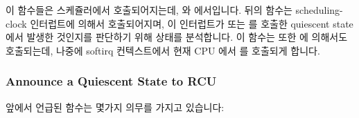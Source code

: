 이 함수들은 스케쥴러에서 호출되어지는데,  와
 에서입니다.
뒤의 함수는 scheduling-clock 인터럽트에 의해서 호출되어지며, 이 인터럽트가
 또는  를 호출한 quiescent state
에서 발생한 것인지를 판단하기 위해 상태를 분석합니다.
이 함수는 또한  에 의해서도 호출되는데, 나중에 softirq
컨텍스트에서 현재 CPU 에서  를 호출되게 합니다.
\iffalse

These functions are invoked from the scheduler, from
\co{__do_softirq()}, and from \co{rcu_check_callbacks()}.
This latter function is invoked from the scheduling-clock interrupt,
and analyzes state to determine whether this interrupt occurred within
a quiescent state, invoking \co{rcu_qsctr_inc()} and/or
\co{rcu_bh_qsctr_inc()}, as appropriate.
It also raises \co{RCU_SOFTIRQ}, which results in
\co{rcu_process_callbacks()} being invoked on the current
CPU at some later time from softirq context.
\fi

\subsubsection{Announce a Quiescent State to RCU}
\label{app:rcuimpl:rcutree:Announce a Quiescent State to RCU}

앞에서 언급된  함수는 몇가지 의무를 가지고
있습니다:
\iffalse

The afore-mentioned \co{rcu_process_callbacks()} function
has several duties:
\fi

